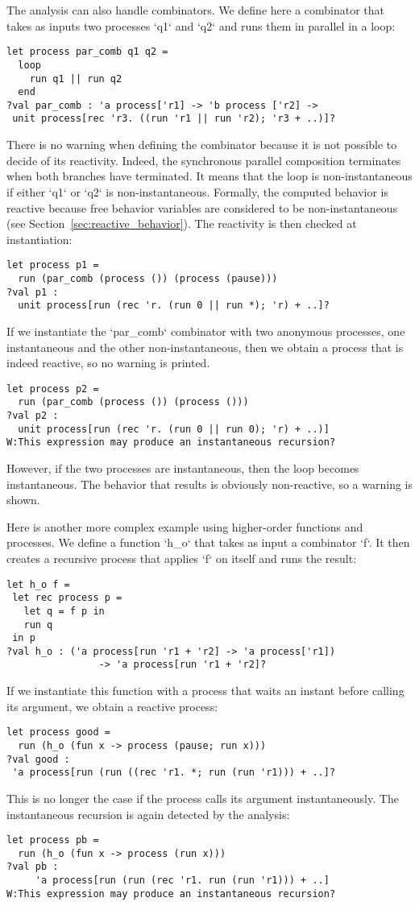 \documentclass[9pt,preprint]{sigplanconf}
\begin{document}
The analysis can also handle combinators. We define here a combinator that takes as inputs two processes `q1` and `q2` and runs them in parallel in a loop:
\begin{lstlisting}
let process par_comb q1 q2 =
  loop
    run q1 || run q2
  end
?val par_comb : 'a process['r1] -> 'b process ['r2] ->
 unit process[rec 'r3. ((run 'r1 || run 'r2); 'r3 + ..)]?
\end{lstlisting}
%
There is no warning when defining the combinator because it is not possible to decide of its reactivity. Indeed, the synchronous parallel composition terminates when both branches have terminated. It means that the loop is non-instantaneous if either `q1` or `q2` is non-instantaneous. Formally, the computed behavior is reactive because free behavior variables are considered to be non-instantaneous (see Section~\ref{sec:reactive_behavior}). The reactivity is then checked at instantiation:
\begin{lstlisting}
let process p1 = 
  run (par_comb (process ()) (process (pause)))
?val p1 : 
  unit process[run (rec 'r. (run 0 || run *); 'r) + ..]?
\end{lstlisting}
If we instantiate the `par_comb` combinator with two anonymous processes, one instantaneous and the other non-instantaneous, then we obtain a process that is indeed reactive, so no warning is printed.
\begin{lstlisting}
let process p2 = 
  run (par_comb (process ()) (process ()))
?val p2 :
  unit process[run (rec 'r. (run 0 || run 0); 'r) + ..)]
W:This expression may produce an instantaneous recursion?
\end{lstlisting}
However, if the two processes are instantaneous, then the loop becomes instantaneous. The behavior that results is obviously non-reactive, so a warning is shown.

Here is another more complex example using higher-order functions and processes. We define a function `h_o` that takes as input a combinator `f`. It then creates a recursive process that applies `f` on itself and runs the result:
\begin{lstlisting}
let h_o f =
 let rec process p =
   let q = f p in
   run q
 in p
?val h_o : ('a process[run 'r1 + 'r2] -> 'a process['r1]) 
                -> 'a process[run 'r1 + 'r2]?
\end{lstlisting}
If we instantiate this function with a process that waits an instant before calling its argument, we obtain a reactive process:
\begin{lstlisting}
let process good = 
  run (h_o (fun x -> process (pause; run x)))
?val good :
 'a process[run (run ((rec 'r1. *; run (run 'r1))) + ..]?
\end{lstlisting}
This is no longer the case if the process calls its argument instantaneously. The instantaneous recursion is again detected by the analysis:
\begin{lstlisting}
let process pb = 
  run (h_o (fun x -> process (run x)))
?val pb : 
     'a process[run (run (rec 'r1. run (run 'r1))) + ..]
W:This expression may produce an instantaneous recursion?
\end{lstlisting}
\end{document}
